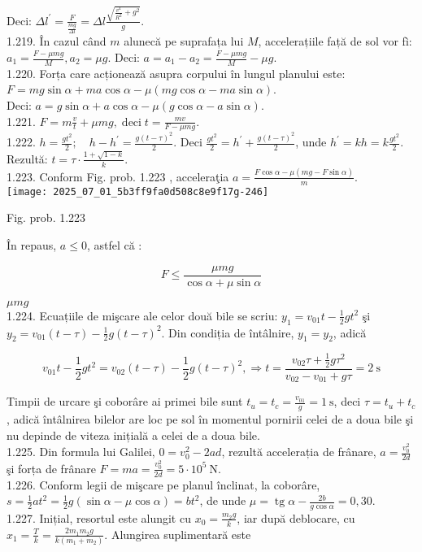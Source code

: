 Deci: $\Delta l^{\prime}=\frac{F}{\frac{m g}{\Delta l}}=\Delta l \frac{\sqrt{\frac{v^{4}}{R^{2}}+g^{2}}}{g}$.\\
1.219. În cazul când $m$ alunecă pe suprafața lui $M$, accelerațiile față de sol vor fì: $a_{1}=\frac{F-\mu m g}{M}, a_{2}=\mu g$. Deci: $a=a_{1}-a_{2}=\frac{F-\mu m g}{M}-\mu g$.\\
1.220. Forța care acționează asupra corpului în lungul planului este:\\
$F=m g \sin \alpha+m a \cos \alpha-\mu(m g \cos \alpha-m a \sin \alpha)$.\\
Deci: $a=g \sin \alpha+a \cos \alpha-\mu(g \cos \alpha-a \sin \alpha)$.\\
1.221. $F=m \frac{v}{t}+\mu m g, \operatorname{deci} t=\frac{m v}{F-\mu m g}$.\\
1.222. $h=\frac{g t^{2}}{2} ; \quad h-h^{\prime}=\frac{g(t-\tau)^{2}}{2}$. Deci $\frac{g t^{2}}{2}=h^{\prime}+\frac{g(t-\tau)^{2}}{2}$, unde $h^{\prime}=k h=k \frac{g t^{2}}{2}$. Rezultă: $t=\tau \cdot \frac{1+\sqrt{1-k}}{k}$.\\
1.223. Conform Fig. prob. 1.223 , acceleraţia $a=\frac{F \cos \alpha-\mu(m g-F \sin \alpha)}{m}$.\\
\texttt{[image: 2025\_07\_01\_5b3ff9fa0d508c8e9f17g-246]}

Fig. prob. 1.223

În repaus, $a \leq 0$, astfel că :

$$
F \leq \frac{\mu m g}{\cos \alpha+\mu \sin \alpha}
$$

$\mu m g$\\
1.224. Ecuațiile de mişcare ale celor două bile se scriu: $y_{1}=v_{01} t-\frac{1}{2} g t^{2}$ şi $y_{2}=v_{01}(t-\tau)-\frac{1}{2} g(t-\tau)^{2}$. Din condiția de întâlnire, $y_{1}=y_{2}$, adică

$$
v_{01} t-\frac{1}{2} g t^{2}=v_{02}(t-\tau)-\frac{1}{2} g(t-\tau)^{2}, \Rightarrow t=\frac{v_{02} \tau+\frac{1}{2} g \tau^{2}}{v_{02}-v_{01}+g \tau}=2 \mathrm{~s}
$$

Timpii de urcare şi coborâre ai primei bile sunt $t_{u}=t_{c}=\frac{v_{01}}{g}=1 \mathrm{~s}$, deci $\tau=t_{u}+t_{c}$, adică întâlnirea bilelor are loc pe sol în momentul pornirii celei de a doua bile şi nu depinde de viteza inițială a celei de a doua bile.\\
1.225. Din formula lui Galilei, $0=v_{0}^{2}-2 a d$, rezultă accelerația de frânare, $a=\frac{v_{0}^{2}}{2 d}$ şi forța de frânare $F=m a=\frac{v_{0}^{2}}{2 d}=5 \cdot 10^{5} \mathrm{~N}$.\\
1.226. Conform legii de mişcare pe planul înclinat, la coborâre, $s=\frac{1}{2} a t^{2}=\frac{1}{2} g(\sin \alpha-\mu \cos \alpha)=b t^{2}$, de unde $\mu=\operatorname{tg} \alpha-\frac{2 b}{g \cos \alpha}=0,30$.\\
1.227. Inițial, resortul este alungit cu $x_{0}=\frac{m_{2} g}{k}$, iar după deblocare, cu $x_{1}=\frac{T}{k}=\frac{2 m_{1} m_{2} g}{k\left(m_{1}+m_{2}\right)}$. Alungirea suplimentară este

